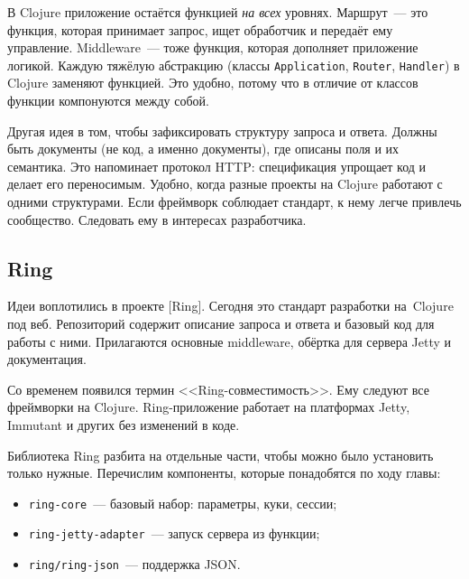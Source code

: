 \label{http-all-function}

В Clojure приложение остаётся функцией \emph{на всех} уровнях. Маршрут~--- это
функция, которая принимает запрос, ищет обработчик и передаёт ему
управление. Middleware~--- тоже функция, которая дополняет приложение
логикой. Каждую тяжёлую абстракцию (классы \verb|Application|, \verb|Router|,
\verb|Handler|) в Clojure заменяют функцией. Это удобно, потому что в отличие от
классов функции компонуются между собой.

Другая идея в том, чтобы зафиксировать структуру запроса и ответа. Должны быть
документы (не код, а именно документы), где описаны поля и их семантика. Это
напоминает протокол HTTP: спецификация упрощает код и делает его
переносимым. Удобно, когда разные проекты на Clojure работают с одними
структурами. Если фреймворк соблюдает стандарт, к нему легче привлечь
сообщество. Следовать ему в интересах разработчика.

\subsection{Ring}

\label{ring-jetty}

Идеи воплотились в проекте [Ring].
Сегодня это стандарт разработки на~Clojure под веб. Репозиторий содержит описание
запроса и ответа и базовый код для работы с ними. Прилагаются основные middleware,
обёртка для сервера Jetty и документация.


\mnoindent
Со временем появился термин <<Ring-совмести\-мость>>. Ему следуют все фреймворки
на Clojure. Ring-приложение работает на платформах Jetty, Immutant и других без
изменений в коде.

Библиотека Ring разбита на отдельные части, чтобы можно было установить только
нужные. Перечислим компоненты, которые понадобятся по ходу главы:

\begin{itemize}

\item
  \verb|ring-core|~--- базовый набор: параметры, куки, сессии;

\item
  \verb|ring-jetty-adapter|~--- запуск сервера из функции;

\item
  \verb|ring/ring-json|~--- поддержка JSON.

\end{itemize}

